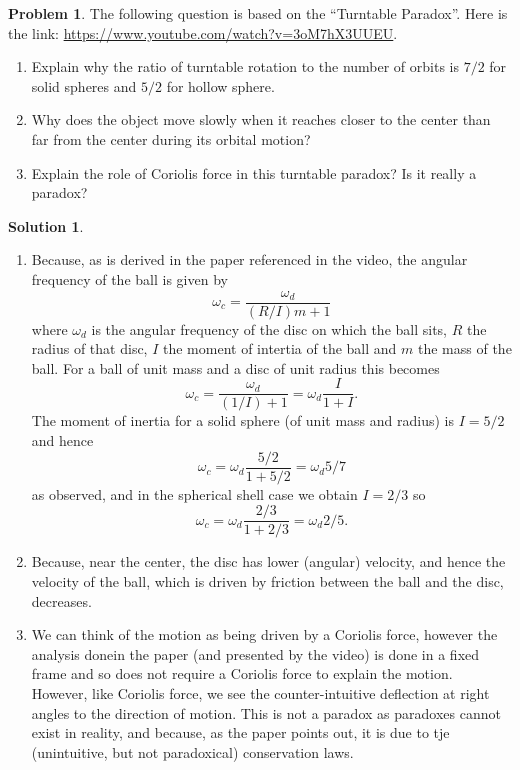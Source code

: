 \documentclass[10pt]{article}
\theoremstyle{definition}
\newtheorem{problem}{Problem}
\newtheorem{soln}{Solution}
\begin{document}
\begin{problem}The following question is based on the “Turntable Paradox”. Here is the link:
\url{https://www.youtube.com/watch?v=3oM7hX3UUEU}.
\begin{enumerate}[label=(\roman*)]
  \item Explain why the ratio of turntable rotation to the number of orbits is $7/2$ for solid
        spheres and $5/2$ for hollow sphere.
  \item Why does the object move slowly when it reaches closer to the center than far
        from the center during its orbital motion?
  \item Explain the role of Coriolis force in this turntable paradox? Is it really a paradox?
\end{enumerate}
\end{problem}
\begin{soln}
  \begin{enumerate}[label=(\roman*)]
    \item Because, as is derived in the paper referenced in the video, the angular frequency of the ball is given by
          $$\omega_c=\frac{\omega_d}{(R/I)m+1}$$
          where $\omega_d$ is the angular frequency of the disc on which the ball sits, $R$ the radius of that disc, $I$ the moment of intertia of the ball and $m$ the mass of the ball.
          For a ball of unit mass and a disc of unit radius this becomes
          $$\omega_c=\frac{\omega_d}{(1/I)+1}=\omega_d \frac{I}{1+I}.$$
          The moment of inertia for a solid sphere (of unit mass and radius) is $I=5/2$ and hence
          $$\omega_c=\omega_d \frac{5/2}{1+5/2}=\omega_d 5/7$$
          as observed, and in the spherical shell case we obtain $I=2/3$ so
          $$\omega_c=\omega_d \frac{2/3}{1+2/3}=\omega_d 2/5.$$
    \item Because, near the center, the disc has lower (angular) velocity, and hence the velocity of the ball, which is driven by friction between the ball and the disc,
          decreases.
    \item We can think of the motion as being driven by a Coriolis force, however the analysis donein the paper (and presented by the video) is done in a fixed frame and so
          does not require a Coriolis force to explain the motion. However, like Coriolis force, we see the counter-intuitive deflection at right angles to the direction of motion.
          This is not a paradox as paradoxes cannot exist in reality, and because, as the paper points out, it is due to tje (unintuitive, but not paradoxical) conservation laws.
  \end{enumerate}
\end{soln}
\end{document}
